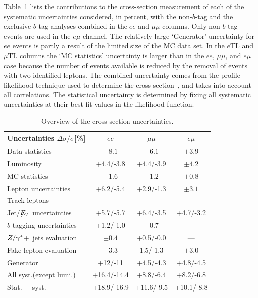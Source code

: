 Table~\ref{tab:syssum} lists the contributions to the cross-section
measurement of each of the systematic uncertainties considered, in
percent, with the non-$b$-tag and the exclusive $b$-tag analyses
combined in the $ee$ and $\mu\mu$ columns.  Only non-$b$-tag events
are used in the $e\mu$ channel.  The relatively large `Generator'
uncertainty for $ee$ events is partly a result of the limited size
of the MC data set.  In the $e$TL and $\mu$TL columns the `MC
statistics' uncertainty is larger than in the $ee$, $\mu\mu$, and
$e\mu$ case because the number of events available is reduced by the
removal of events with two identified leptons.  The combined
uncertainty comes from the profile likelihood technique used to
determine the cross section~\cite{ATL-CONF-2011-034}, and takes into
account all correlations.  The statistical uncertainty is determined
by fixing all systematic uncertainties at their best-fit values in
the likelihood function.

%


\begin{table}[htb]
\begin{footnotesize}
\centering
\begin{tabular}{|l|c|c|c|}
\hline
           Uncertainties  $\Delta\sigma/\sigma$[\%]        & $ee$              & $\mu\mu$          & $e\mu$ \\ \hline

Data statistics           &    $\pm 8.1$  &    $\pm 6.1$  &    $\pm 3.9$  \\
\hline
Luminosity                &    +4.4/-3.8 &    +4.4/-3.9   &    $\pm 4.2$  \\
\hline
MC statistics             &    $\pm 1.6$  &    $\pm 1.2$  &    $\pm 0.8$  \\
Lepton uncertainties      &    +6.2/-5.4  &    +2.9/-1.3  &    $\pm 3.1$  \\
Track-leptons             &     ---       &    ---        & ---           \\
Jet/$\not\!\!{E_{T}}$ uncertainties  &    +5.7/-5.7  &    +6.4/-3.5  & +4.7/-3.2     \\
$b$-tagging uncertainties &    +1.2/-1.0  &    $\pm 0.7$  &     ---       \\
$Z/\gamma^{*}$+~jets evaluation    &    $\pm 0.4$  &    +0.5/-0.0  &     ---       \\
Fake lepton evaluation    &    $\pm 3.3$  &    1.5/-1.3   &    $\pm 3.0$  \\
Generator                 &   +12/-11     &    +4.5/-4.3  &   +4.8/-4.5   \\
\hline
All syst.(except lumi.)   &   +16.4/-14.4 &    +8.8/-6.4  &    +8.2/-6.8  \\
\hline \hline
Stat. + syst.             &   +18.9/-16.9 &    +11.6/-9.5 &    +10.1/-8.8 \\
\hline

\end{tabular}
\caption{Overview of the \ttbar{} cross-section uncertainties.}
\label{tab:syssum}
\end{footnotesize}
\end{table}


